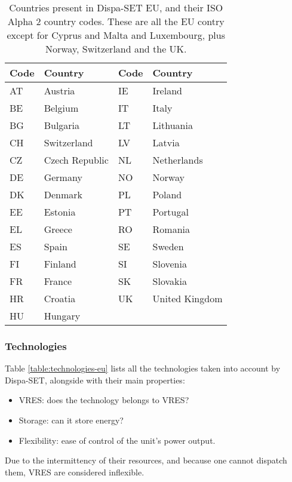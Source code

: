 \begin{table}[h]
    \centering
	\begin{tabular}{|l l|l l|}
		\hline
		Code & Country & Code & Country \\
		\hline
		AT & Austria        & IE & Ireland \\
		BE & Belgium        & IT & Italy \\
		BG & Bulgaria       & LT & Lithuania \\
		CH & Switzerland    & LV & Latvia \\
		CZ & Czech Republic & NL & Netherlands \\
		DE & Germany        & NO & Norway \\
		DK & Denmark        & PL & Poland \\
		EE & Estonia        & PT & Portugal \\
		EL & Greece         & RO & Romania \\
		ES & Spain          & SE & Sweden \\
		FI & Finland        & SI & Slovenia \\
		FR & France         & SK & Slovakia \\
		HR & Croatia        & UK & United Kingdom \\
		HU & Hungary        & & \\
		\hline
	\end{tabular}
	\caption{Countries present in Dispa-SET EU, and their ISO Alpha 2 country codes. These are all the EU contry except for Cyprus and Malta and Luxembourg, plus Norway, Switzerland and the UK.}
	\label{table:countries-eu}
\end{table}

\subsubsection{Technologies}

Table \ref{table:technologies-eu} lists all the technologies taken into account by Dispa-SET, alongside with their main properties: 

\begin{itemize}
    \item VRES: does the technology belongs to VRES?
    \item Storage: can it store energy?
    \item Flexibility: ease of control of the unit's power output.
\end{itemize}

Due to the intermittency of their resources, and because one cannot dispatch them, VRES are considered inflexible.

